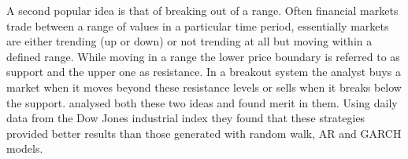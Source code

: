 A second popular idea is that of breaking out of a range. Often financial markets trade between a range of values in a particular time period, essentially markets are either trending (up or down) or not trending at all but moving within a defined range. While moving in a range the lower price boundary is referred to as support and the upper one as resistance. In a breakout system the analyst buys a market when it moves beyond these resistance levels or sells when it breaks below the support. \cite{Brock} analysed both these two ideas and found merit in them. Using daily data from the Dow Jones industrial index they found that these strategies provided better results than those generated with random walk, AR and GARCH models.





